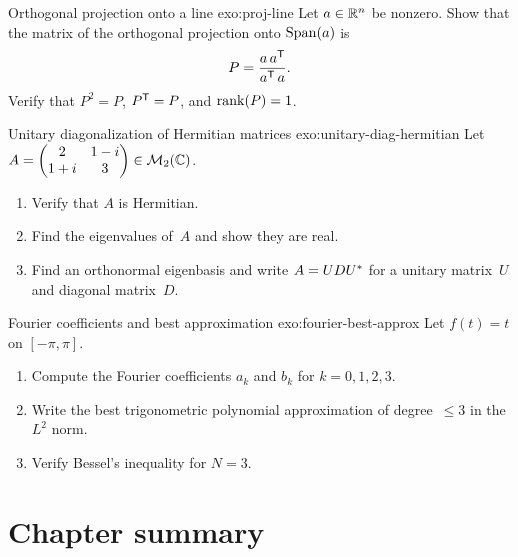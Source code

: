 \begin{exercise}{Orthogonal projection onto a line \challenging}%
{exo:proj-line}
Let $a\in{\mathbb{R}}^n$ be nonzero.  Show that the matrix of the orthogonal
projection onto $\operatorname{Span}(a)$ is
\[
  P = \frac{a\,{a}^{\mathsf{T}}}{{a}^{\mathsf{T}}\,a}.
\]
Verify that $P^2 = P$, ${P}^{\mathsf{T}} = P$, and $\operatorname{rank}(P) = 1$.
\end{exercise}

\begin{exercise}{Unitary diagonalization of Hermitian matrices \challenging}%
{exo:unitary-diag-hermitian}
Let $A = \begin{pmatrix} 2 & 1-i \\ 1+i & 3 \end{pmatrix}\in\mathcal{M}_2({\mathbb{C}})$.
\begin{enumerate}[label=(\alph*)]
  \item Verify that $A$ is Hermitian.
  \item Find the eigenvalues of~$A$ and show they are real.
  \item Find an orthonormal eigenbasis and write $A = U D{U}^{*}$
    for a unitary matrix~$U$ and diagonal matrix~$D$.
\end{enumerate}
\end{exercise}

\begin{exercise}{Fourier coefficients and best approximation \challenging}%
{exo:fourier-best-approx}
Let $f(t) = t$ on $[-\pi,\pi]$.
\begin{enumerate}[label=(\alph*)]
  \item Compute the Fourier coefficients $a_k$ and $b_k$ for
    $k = 0,1,2,3$.
  \item Write the best trigonometric polynomial approximation of
    degree~$\leq 3$ in the $L^2$ norm.
  \item Verify Bessel's inequality for $N = 3$.
\end{enumerate}
\end{exercise}


\section{Chapter summary}\label{sec:inner-product-summary}

